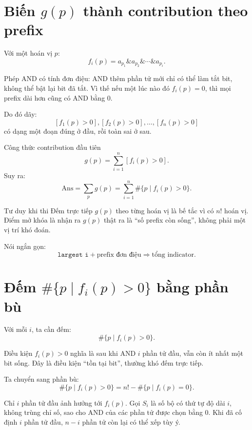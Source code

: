 \documentclass[12pt]{article}
\begin{document}
\section{\texorpdfstring{Biến \(g(p)\) thành contribution theo prefix}{Biến g(p) thành contribution theo prefix}}

Với một hoán vị \(p\):
\[
f_i(p)=a_{p_1}\mathbin{\&}a_{p_2}\mathbin{\&}\cdots\mathbin{\&}a_{p_i}.
\]

Phép AND có tính đơn điệu: AND thêm phần tử mới chỉ có thể làm tắt bit, không thể bật lại bit đã tắt. Vì thế nếu một lúc nào đó \(f_i(p)=0\), thì mọi prefix dài hơn cũng có AND bằng \(0\).

Do đó dãy:
\[
[f_1(p)>0], [f_2(p)>0], \ldots, [f_n(p)>0]
\]
có dạng một đoạn đúng ở đầu, rồi toàn sai ở sau.

\begin{resultbox}{Công thức contribution đầu tiên}
\[
g(p)=\sum_{i=1}^{n}[f_i(p)>0].
\]
Suy ra:
\[
\mathrm{Ans}
=
\sum_p g(p)
=
\sum_{i=1}^{n}\#\{p\mid f_i(p)>0\}.
\]
\end{resultbox}

\begin{thinkbox}{Tư duy khi thi}
Đếm trực tiếp \(g(p)\) theo từng hoán vị là bế tắc vì có \(n!\) hoán vị. Điểm mở khóa là nhận ra \(g(p)\) thật ra là ``số prefix còn sống'', không phải một vị trí khó đoán.

Nói ngắn gọn:
\[
\texttt{largest i} + \text{prefix đơn điệu}
\Rightarrow
\text{tổng indicator}.
\]
\end{thinkbox}

\section{\texorpdfstring{Đếm \(\#\{p\mid f_i(p)>0\}\) bằng phần bù}{Đếm số hoán vị bằng phần bù}}

Với mỗi \(i\), ta cần đếm:
\[
\#\{p\mid f_i(p)>0\}.
\]

Điều kiện \(f_i(p)>0\) nghĩa là sau khi AND \(i\) phần tử đầu, vẫn còn ít nhất một bit sống. Đây là điều kiện ``tồn tại bit'', thường khó đếm trực tiếp.

Ta chuyển sang phần bù:
\[
\#\{p\mid f_i(p)>0\}
=
n!-\#\{p\mid f_i(p)=0\}.
\]

Chỉ \(i\) phần tử đầu ảnh hưởng tới \(f_i(p)\). Gọi \(S_i\) là số bộ có thứ tự độ dài \(i\), không trùng chỉ số, sao cho AND của các phần tử được chọn bằng \(0\). Khi đã cố định \(i\) phần tử đầu, \(n-i\) phần tử còn lại có thể xếp tùy ý.
\end{document}
